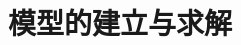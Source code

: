 \documentclass[12pt,a4paper]{article}
\newcommand{\prompt}[1]{\par\noindent\textbf{【写作提示】}#1\par}      %
\newcommand{\pitfall}[1]{\par\noindent\textbf{【容易失分】}#1\par}     %
\begin{document}


\section{模型的建立与求解}





\end{document}
